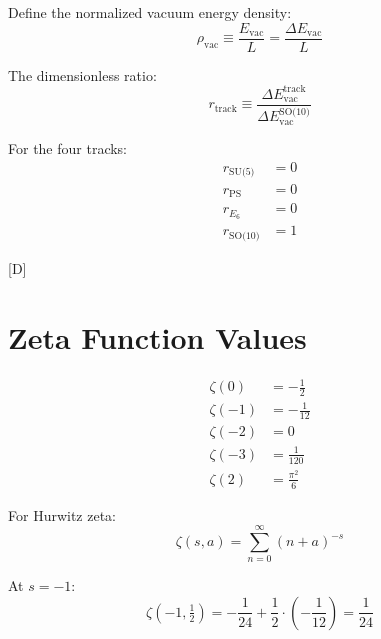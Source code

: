 \documentclass[11pt,a4paper]{article}
\newcommand{\tagD}{\textcolor{blue!70!black}{[D]}}
\begin{document}
Define the normalized vacuum energy density:
\begin{equation}
\label{eq:norm-density}
\rho_{\text{vac}} \equiv \frac{E_{\text{vac}}}{L} = \frac{\Delta E_{\text{vac}}}{L}
\end{equation}

The dimensionless ratio:
\begin{equation}
\label{eq:dimensionless-ratio}
r_{\text{track}} \equiv \frac{\Delta E_{\text{vac}}^{\text{track}}}{\Delta E_{\text{vac}}^{\text{SO(10)}}}
\end{equation}

For the four tracks:
\begin{align}
\label{eq:r-su5}
r_{\text{SU(5)}} &= 0 \\
\label{eq:r-ps}
r_{\text{PS}} &= 0 \\
\label{eq:r-e6}
r_{E_6} &= 0 \\
\label{eq:r-so10}
r_{\text{SO(10)}} &= 1
\end{align}

\tagD

\appendix

\section{Zeta Function Values}
\label{app:zeta}

\begin{align}
\label{eq:app-zeta-0}
\zeta(0) &= -\frac{1}{2} \\
\label{eq:app-zeta-m1}
\zeta(-1) &= -\frac{1}{12} \\
\label{eq:app-zeta-m2}
\zeta(-2) &= 0 \\
\label{eq:app-zeta-m3}
\zeta(-3) &= \frac{1}{120} \\
\label{eq:app-zeta-2}
\zeta(2) &= \frac{\pi^2}{6}
\end{align}

For Hurwitz zeta:
\begin{equation}
\label{eq:app-hurwitz}
\zeta(s, a) = \sum_{n=0}^\infty (n+a)^{-s}
\end{equation}

At $s = -1$:
\begin{equation}
\label{eq:app-hurwitz-m1}
\zeta(-1, \tfrac{1}{2}) = -\frac{1}{24} + \frac{1}{2} \cdot (-\frac{1}{12}) = \frac{1}{24}
\end{equation}
\end{document}
